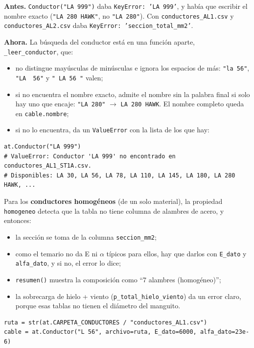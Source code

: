 \documentclass[11pt,a4paper]{article}
\newcommand{\code}[1]{\texttt{#1}}
\newcommand{\antes}[1]{\noindent\textcolor{antes}{\textbf{Antes.}} #1\par\smallskip}
\newcommand{\ahora}[1]{\noindent\textcolor{ahora}{\textbf{Ahora.}} #1\par\smallskip}
\begin{document}
\antes{\code{Conductor("LA 999")} daba \code{KeyError: 'LA 999'}, y había que escribir el nombre exacto (\code{"LA 280 HAWK"}, no \code{"LA 280"}). Con \code{conductores\_AL1.csv} y \code{conductores\_AL2.csv} daba \code{KeyError: 'seccion\_total\_mm2'}.}

\ahora{La búsqueda del conductor está en una función aparte, \code{\_leer\_conductor}, que:}
\begin{itemize}[leftmargin=1.5em]
  \item no distingue mayúsculas de minúsculas e ignora los espacios de más: \code{"la 56"}, \code{"LA~~56"} y \code{" LA 56 "} valen;
  \item si no encuentra el nombre exacto, admite el nombre sin la palabra final si solo hay uno que encaje: \code{"LA 280"} $\rightarrow$ \code{LA 280 HAWK}. El nombre completo queda en \code{cable.nombre};
  \item si no lo encuentra, da un \code{ValueError} con la lista de los que hay:
\end{itemize}
\begin{lstlisting}
at.Conductor("LA 999")
# ValueError: Conductor 'LA 999' no encontrado en conductores_AL1_ST1A.csv.
# Disponibles: LA 30, LA 56, LA 78, LA 110, LA 145, LA 180, LA 280 HAWK, ...
\end{lstlisting}

Para los \textbf{conductores homogéneos} (de un solo material), la propiedad \code{homogeneo} detecta que la tabla no tiene columna de alambres de acero, y entonces:
\begin{itemize}[leftmargin=1.5em]
  \item la sección se toma de la columna \code{seccion\_mm2};
  \item como el temario no da E ni $\alpha$ típicos para ellos, hay que darlos con \code{E\_dato} y \code{alfa\_dato}, y si no, el error lo dice;
  \item \code{resumen()} muestra la composición como ``7 alambres (homogéneo)'';
  \item la sobrecarga de hielo + viento (\code{p\_total\_hielo\_viento}) da un error claro, porque esas tablas no tienen el diámetro del manguito.
\end{itemize}

\begin{lstlisting}
ruta = str(at.CARPETA_CONDUCTORES / "conductores_AL1.csv")
cable = at.Conductor("L 56", archivo=ruta, E_dato=6000, alfa_dato=23e-6)
\end{lstlisting}
\end{document}
